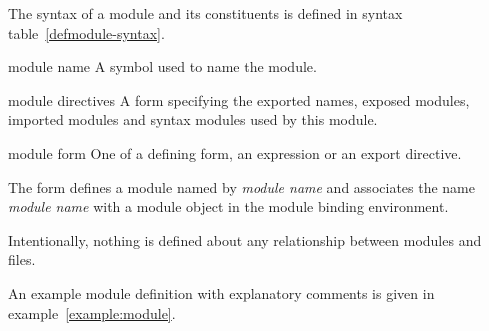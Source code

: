 %
\label{defmodule}
%
\begin{optDefinition}
%
\Syntax
\noindent
The syntax of a module and its constituents is defined in
syntax table~\ref{defmodule-syntax}.
%
\begin{arguments}
    \item[module name] A symbol used to name the module.
    \item[module directives] A form specifying the exported names, exposed
    modules, imported modules and syntax modules used by this module.
    \item[module form] One of a defining form, an expression or an export
    directive.
\end{arguments}
%
\remarks%
The  form defines a module named by {\em module name}
and associates the name {\em module name} with a module object in the
module binding environment.
\begin{note}
    Intentionally, nothing is defined about any relationship between modules and
    files.
\end{note}
%
\examples
An example module definition with explanatory comments is given in
example~\ref{example:module}.
%
\end{optDefinition}
